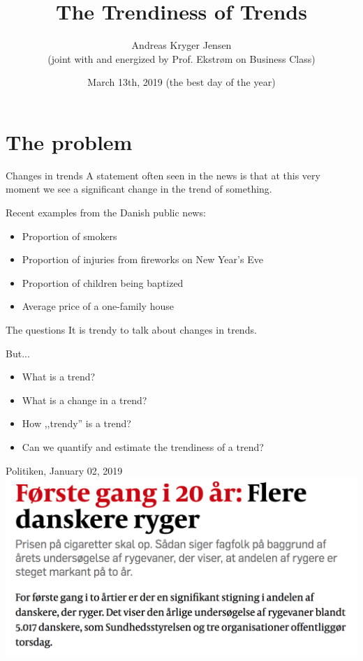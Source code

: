 \documentclass[ignorenonframetext,xcolor=pdflatex,table,dvipsnames,serif]{beamer}
\title{The Trendiness of Trends}
\date{March 13th, 2019 (the best day of the year)}
\author{Andreas Kryger Jensen\\ \scriptsize (joint with and energized by Prof. Ekstrøm on Business Class)}
\institute{Biostatistics, Institute of Public Health\\ University of Copenhagen}
\begin{document}
\frame[plain]{\titlepage}
 
 

\section{The problem}

\begin{frame}{Changes in trends}
A statement often seen in the news is that at \alert{this very moment} we see a significant change in the trend of something.

Recent examples from the Danish public news:
\begin{itemize}
  \item{Proportion of smokers}
  \item{Proportion of injuries from fireworks on New Year's Eve}
  \item{Proportion of children being baptized}
  \item{Average price of a one-family house}
\end{itemize}
\end{frame}


\begin{frame}{The questions}
It is \alert{trendy} to talk about changes in trends.

But...
\begin{itemize}
  \item{What is a trend?}
  \item{What is a change in a trend?}
  \item{How ,,trendy'' is a trend?}
  \item{Can we quantify and estimate the \alert{trendiness} of a trend?}
\end{itemize}

\end{frame}


\begin{frame}{Politiken, January 02, 2019}
\center\includegraphics[scale=0.5]{rygere.png}
\end{frame}
\end{document}
